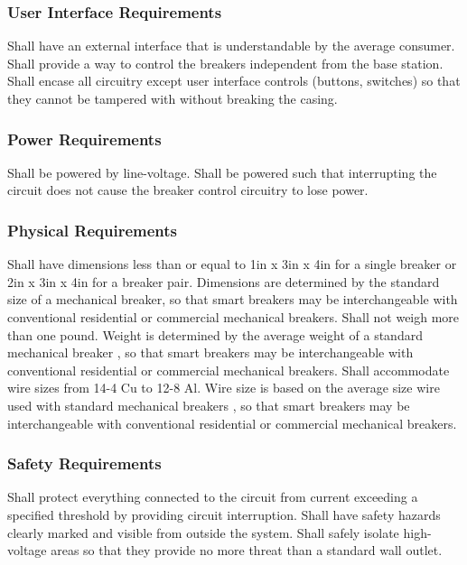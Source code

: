 \subsubsection{User Interface Requirements}
\begin{outline}[enumerate]
\1 Shall have an external interface that is understandable by the average consumer.
\1 Shall provide a way to control the breakers independent from the base station.
\1 Shall encase all circuitry except user interface controls (buttons, switches) so that they cannot be tampered with without breaking the casing.
\end{outline}

\subsubsection{Power Requirements}
\begin{outline}[enumerate]
\1 Shall be powered by line-voltage.
\1 Shall be powered such that interrupting the circuit does not cause the breaker control circuitry to lose power.
\end{outline}

\subsubsection{Physical Requirements}
\begin{outline}[enumerate]
\1 Shall have dimensions less than or equal to 1in x 3in x 4in for a single breaker or 2in x 3in x 4in for a breaker pair.
\2Dimensions are determined by the standard size of a mechanical breaker, so that smart breakers may be interchangeable with conventional residential or commercial mechanical breakers.
\1 Shall not weigh more than one pound.
\2 Weight is determined by the average weight of a standard mechanical breaker \cite{homedepot}, so that smart breakers may be interchangeable with conventional residential or commercial mechanical breakers.
\1 Shall accommodate wire sizes from 14-4 Cu to 12-8 Al.
\2 Wire size is based on the average size wire used with standard mechanical breakers \cite{homedepot}, so that smart breakers may be interchangeable with conventional residential or commercial mechanical breakers.
\end{outline}

\subsubsection{Safety Requirements}
\begin{outline}[enumerate]
\1 Shall protect everything connected to the circuit from current exceeding a specified threshold by providing circuit interruption.
\1 Shall have safety hazards clearly marked and visible from outside the system.
\1 Shall safely isolate high-voltage areas so that they provide no more threat than a standard wall outlet.
\end{outline}

